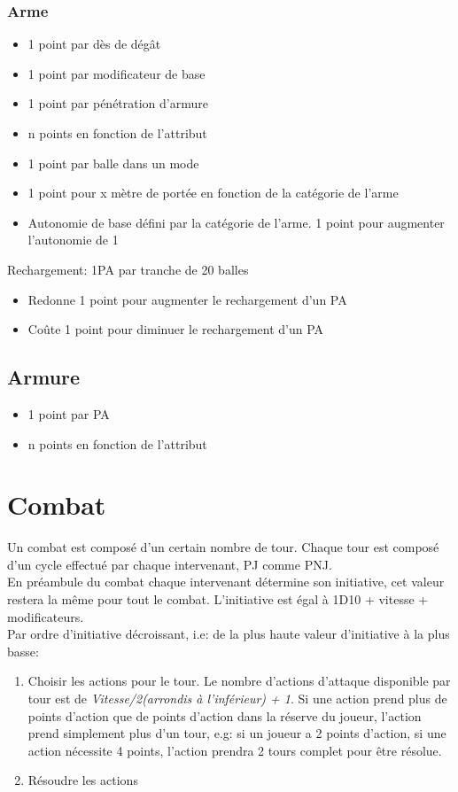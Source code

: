 \subsubsection*{Arme}
\begin{itemize}
\item 1 point par dès de dégât
\item 1 point par modificateur de base
\item 1 point par pénétration d'armure
\item n points en fonction de l'attribut
\item 1 point par balle dans un mode
\item 1 point pour x mètre de portée en fonction de la catégorie de l'arme
\item Autonomie de base défini par la catégorie de l'arme. 1 point pour augmenter l'autonomie de 1
\end{itemize}
Rechargement: 1PA par tranche de 20 balles
\begin{itemize}
\item Redonne 1 point pour augmenter le rechargement d'un PA
\item Coûte 1 point pour diminuer le rechargement d'un PA
\end{itemize}

\subsection*{Armure}

\begin{itemize}
\item 1 point par PA
\item n points en fonction de l'attribut
\end{itemize}
\section{Combat}

Un combat est composé d'un certain nombre de tour. Chaque tour est composé d'un cycle effectué par chaque intervenant, PJ comme PNJ. \\
En préambule du combat chaque intervenant détermine son initiative, cet valeur restera la même pour tout le combat. L'initiative est égal à 1D10 + vitesse + modificateurs. \\
Par ordre d'initiative décroissant, i.e: de la plus haute valeur d'initiative à la plus basse: \\
\begin{enumerate}
\item Choisir les actions pour le tour. Le nombre d'actions d'attaque disponible par tour est de \textit{Vitesse/2(arrondis à l'inférieur) + 1}. Si une action prend plus de points d'action que de points d'action dans la réserve du joueur, l'action prend simplement plus d'un tour, e.g: si un joueur a 2 points d'action, si une action nécessite 4 points, l'action prendra 2 tours complet pour être résolue.
\item Résoudre les actions
\end{enumerate} 

